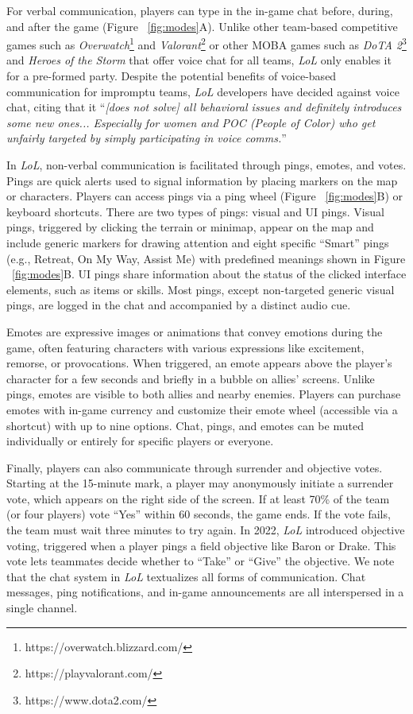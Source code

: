 For verbal communication, players can type in the in-game chat before, during, and after the game (Figure ~\ref{fig:modes}A). Unlike other team-based competitive games such as \textit{Overwatch}\footnote{https://overwatch.blizzard.com/} and \textit{Valorant}\footnote{https://playvalorant.com/} or other MOBA games such as \textit{DoTA 2}\footnote{https://www.dota2.com/} and \textit{Heroes of the Storm} that offer voice chat for all teams, \textit{LoL} only enables it for a pre-formed party. Despite the potential benefits of voice-based communication for impromptu teams, \textit{LoL} developers have decided against voice chat, citing that it ``\textit{[does not solve] all behavioral issues and definitely introduces some new ones... Especially for women and POC (People of Color) who get unfairly targeted by simply participating in voice comms.}''~\cite{carver2023}


In \textit{LoL}, non-verbal communication is facilitated through pings, emotes, and votes. Pings are quick alerts used to signal information by placing markers on the map or characters. Players can access pings via a ping wheel (Figure ~\ref{fig:modes}B) or keyboard shortcuts. There are two types of pings: visual and UI pings. Visual pings, triggered by clicking the terrain or minimap, appear on the map and include generic markers for drawing attention and eight specific ``Smart'' pings (e.g., Retreat, On My Way, Assist Me) with predefined meanings shown in Figure ~\ref{fig:modes}B. UI pings share information about the status of the clicked interface elements, such as items or skills. Most pings, except non-targeted generic visual pings, are logged in the chat and accompanied by a distinct audio cue.

Emotes are expressive images or animations that convey emotions during the game, often featuring characters with various expressions like excitement, remorse, or provocations. When triggered, an emote appears above the player’s character for a few seconds and briefly in a bubble on allies’ screens. Unlike pings, emotes are visible to both allies and nearby enemies. Players can purchase emotes with in-game currency and customize their emote wheel (accessible via a shortcut) with up to nine options. Chat, pings, and emotes can be muted individually or entirely for specific players or everyone.

Finally, players can also communicate through surrender and objective votes. Starting at the 15-minute mark, a player may anonymously initiate a surrender vote, which appears on the right side of the screen. If at least 70\% of the team (or four players) vote ``Yes'' within 60 seconds, the game ends. If the vote fails, the team must wait three minutes to try again. In 2022, \textit{LoL} introduced objective voting, triggered when a player pings a field objective like Baron or Drake. This vote lets teammates decide whether to ``Take'' or ``Give'' the objective. We note that the chat system in \textit{LoL} textualizes all forms of communication. Chat messages, ping notifications, and in-game announcements are all interspersed in a single channel. 

